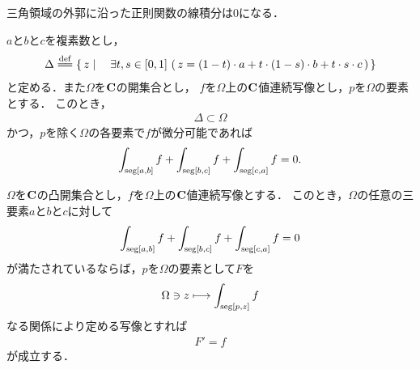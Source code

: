 	三角領域の外郭に沿った正則関数の線積分は$0$になる．
	
	\begin{screen}
		\begin{thm}\label{Cauchy_Goursat_theorem}
			$a$と$b$と$c$を複素数とし，
			\begin{align}
				\Delta \defeq \Set{z}{\exists t,s \in [0,1]\, 
				\left(\, z = (1-t) \cdot a 
				+ t \cdot (1-s) \cdot b 
				+ t \cdot s \cdot c\, \right)}
			\end{align}
			と定める．また$\Omega$を$\mathbf{C}$の開集合とし，
			$f$を$\Omega$上の$\mathbf{C}$値連続写像とし，$p$を$\Omega$の要素とする．
			このとき，
			\begin{align}
				\Delta \subset \Omega
			\end{align}
			かつ，$p$を除く$\Omega$の各要素で$f$が微分可能であれば
			\begin{align}
				\int_{\operatorname{seg}[a,b]} f + \int_{\operatorname{seg}[b,c]} f + \int_{\operatorname{seg}[c,a]} f = 0.
			\end{align}
		\end{thm}
	\end{screen}
	
	\begin{screen}
		\begin{thm}
		\label{thm:a_holomorphic_function_is_derivative_of_some_holomorphic_function_on_convex_open}
			$\Omega$を$\mathbf{C}$の凸開集合とし，$f$を$\Omega$上の$\mathbf{C}$値連続写像とする．
			このとき，$\Omega$の任意の三要素$a$と$b$と$c$に対して
			\begin{align}
				\int_{\operatorname{seg}[a,b]} f + \int_{\operatorname{seg}[b,c]} f + \int_{\operatorname{seg}[c,a]} f = 0
			\end{align}
			が満たされているならば，$p$を$\Omega$の要素として$F$を
			\begin{align}
				\Omega \ni z \longmapsto \int_{\operatorname{seg}[p,z]} f
			\end{align}
			なる関係により定める写像とすれば
			\begin{align}
				F' = f
			\end{align}
			が成立する．
		\end{thm}
	\end{screen}
	
